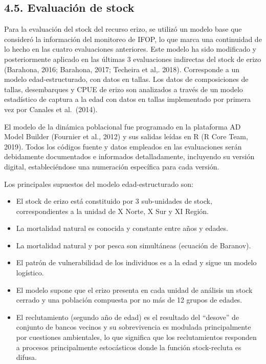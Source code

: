 \documentclass[
]{article}
\providecommand{\tightlist}{%
  \setlength{\itemsep}{0pt}\setlength{\parskip}{0pt}}
\begin{document}
\hypertarget{evaluaciuxf3n-de-stock}{%
\subsection{4.5. Evaluación de stock}\label{evaluaciuxf3n-de-stock}}

Para la evaluación del stock del recurso erizo, se utilizó un modelo
base que consideró la información del monitoreo de IFOP, lo que marca
una continuidad de lo hecho en las cuatro evaluaciones anteriores. Este
modelo ha sido modificado y posteriormente aplicado en las últimas 3
evaluaciones indirectas del stock de erizo (Barahona, 2016; Barahona,
2017; Techeira et al,. 2018). Corresponde a un modelo edad-estructurado,
con datos en tallas. Los datos de composiciones de tallas, desembarques
y CPUE de erizo son analizados a través de un modelo estadístico de
captura a la edad con datos en tallas implementado por primera vez por
Canales et al.~(2014).

El modelo de la dinámica poblacional fue programado en la plataforma AD
Model Builder (Fournier et al., 2012) y sus salidas leídas en R (R Core
Team, 2019). Todos los códigos fuente y datos empleados en las
evaluaciones serán debidamente documentados e informados detalladamente,
incluyendo su versión digital, estableciéndose una numeración específica
para cada versión.

Los principales supuestos del modelo edad-estructurado son:

\begin{itemize}
\tightlist
\item
  El stock de erizo está constituido por 3 sub-unidades de stock,
  correspondientes a la unidad de X Norte, X Sur y XI Región.
\item
  La mortalidad natural es conocida y constante entre años y edades.
\item
  La mortalidad natural y por pesca son simultáneas (ecuación de
  Baranov).
\item
  El patrón de vulnerabilidad de los individuos es a la edad y sigue un
  modelo logístico.
\item
  El modelo supone que el erizo presenta en cada unidad de análisis un
  stock cerrado y una población compuesta por no más de 12 grupos de
  edades.
\item
  El reclutamiento (segundo año de edad) es el resultado del ``desove''
  de conjunto de bancos vecinos y su sobrevivencia es modulada
  principalmente por cuestiones ambientales, lo que significa que los
  reclutamientos responden a procesos principalmente estocásticos donde
  la función stock-recluta es difusa.
\end{itemize}
\end{document}

